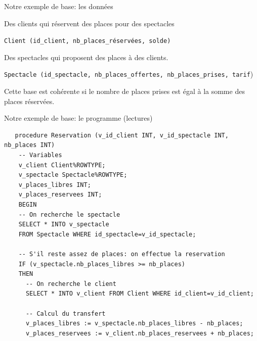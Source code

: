 \begin{frame}{Notre exemple de base: les données}

\begin{redbullet}

  \item Des clients qui réservent des places pour des spectacles
  
   \medskip
   
   \texttt{Client (id\_client, nb\_places\_réservées, solde)}

\bigskip

  \item Des spectacles qui proposent des places à des clients.

\medskip

   \texttt{Spectacle (id\_spectacle, nb\_places\_offertes, nb\_places\_prises, tarif})
\end{redbullet}

\begin{blocgauche}
Cette base est \alert{cohérente} si \alert{le nombre de places prises}
est égal à \alert{la somme des places réservées}.
\end{blocgauche}
\end{frame}


\begin{frame}[fragile]{Notre exemple de base: le programme (lectures)}

\begin{verbatim}
   procedure Reservation (v_id_client INT, v_id_spectacle INT, nb_places INT)
    -- Variables
    v_client Client%ROWTYPE;
    v_spectacle Spectacle%ROWTYPE;
    v_places_libres INT;  
    v_places_reservees INT;  
    BEGIN
    -- On recherche le spectacle
    SELECT * INTO v_spectacle 
    FROM Spectacle WHERE id_spectacle=v_id_spectacle;
  
    -- S'il reste assez de places: on effectue la reservation
    IF (v_spectacle.nb_places_libres >= nb_places) 
    THEN
      -- On recherche le client
      SELECT * INTO v_client FROM Client WHERE id_client=v_id_client;

      -- Calcul du transfert
      v_places_libres := v_spectacle.nb_places_libres - nb_places;
      v_places_reservees := v_client.nb_places_reservees + nb_places;   
 \end{verbatim}

\end{frame}


